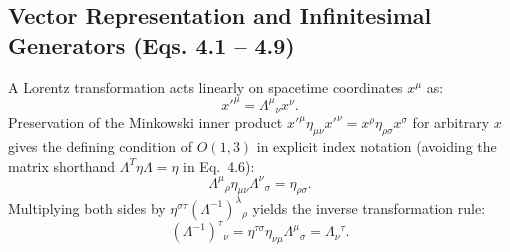 \documentclass[11pt,a4paper]{article}
\begin{document}
\subsection{Vector Representation and Infinitesimal Generators (Eqs. 4.1 -- 4.9)}
A Lorentz transformation acts linearly on spacetime coordinates $x^\mu$ as:
\begin{equation}
    x'^\mu = \Lambda^\mu{}_\nu x^\nu.
\end{equation}
Preservation of the Minkowski inner product $x'^\mu \eta_{\mu\nu} x'^\nu = x^\rho \eta_{\rho\sigma} x^\sigma$ for arbitrary $x$ gives the defining condition of $O(1,3)$ in explicit index notation (avoiding the matrix shorthand $\Lambda^T \eta \Lambda = \eta$ in Eq.~4.6):
\begin{equation}
    \Lambda^\mu{}_\rho \eta_{\mu\nu} \Lambda^\nu{}_\sigma = \eta_{\rho\sigma}.
\end{equation}
Multiplying both sides by $\eta^{\sigma\tau} (\Lambda^{-1})^\lambda{}_\rho$ yields the inverse transformation rule:
\begin{equation}
    (\Lambda^{-1})^\tau{}_\nu = \eta^{\tau\sigma}\eta_{\nu\mu}\Lambda^\mu{}_\sigma = \Lambda_\nu{}^\tau.
\end{equation}
\end{document}
